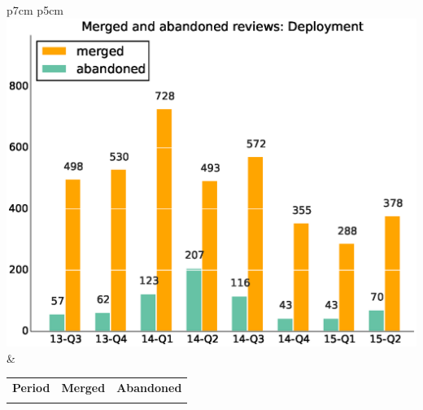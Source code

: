 \documentclass[a4wide,11pt]{article}
\begin{document}
\begin{tabular}{p{7cm} p{5cm}}
    \vspace{0pt} 
    \includegraphics[scale=.35]{figs/submitted_reviewsDeployment.eps}
    & 
    \vspace{0pt}
    \begin{tabular}{l|r|r|}%
    \bfseries Period & \bfseries Merged & \bfseries Abandoned %
    \csvreader[head to column names]{data/submitted_reviewsDeployment.csv}{}%
    {\\ & \merged & \abandoned}
    \end{tabular}
\end{tabular}



\end{document}
